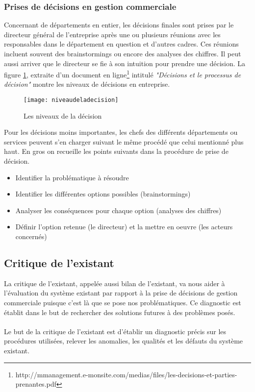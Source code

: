 \subsubsection{Prises de décisions en gestion commerciale}
Concernant de départements en entier, les décisions finales sont prises par le directeur général de l’entreprise après une ou plusieurs réunions avec les responsables dans le département en question et d’autres cadres. Ces réunions incluent souvent des brainstormings ou encore des analyses des chiffres. Il peut aussi arriver que le directeur se fie à son intuition pour prendre une décision. La figure \ref{fig:niveaudeladecision}, extraite d'un document en ligne\footnote{http://mmanagement.e-monsite.com/medias/files/les-decisions-et-parties-prenantes.pdf} intitulé \textit{"Décisions et le processus de décision"} montre les niveaux de décisions en entreprise.

\begin{figure}[H]
    \centering
    \texttt{[image: niveaudeladecision]}
    \caption{Les niveaux de la décision}
    \label{fig:niveaudeladecision}
\end{figure}


Pour les décisions moins importantes, les chefs des différents départements ou services peuvent s’en charger suivant le même procédé que celui mentionné plus haut. En gros on recueille les points suivants dans la procédure de prise de décision.
\begin{itemize}
    \item Identifier la problématique à résoudre
    \item Identifier les différentes options possibles (brainstormings)
    \item Analyser les conséquences pour chaque option (analyses des chiffres)
    \item Définir l'option retenue (le directeur) et la mettre en oeuvre (les acteurs concernés)
\end{itemize}

\subsection{Critique de l’existant}
La critique de l'existant, appelée aussi bilan de l'existant, va nous aider à l'évaluation du système existant par rapport à la prise de décisions de gestion commerciale puisque c'est là que se pose nos problématiques. Ce diagnostic est établit dans le but de rechercher des solutions futures à des problèmes posés.
\paragraph{}
Le but de la critique de l'existant est d'établir un diagnostic précis sur les procédures utilisées, relever les anomalies, les qualités et les défauts du système existant.
